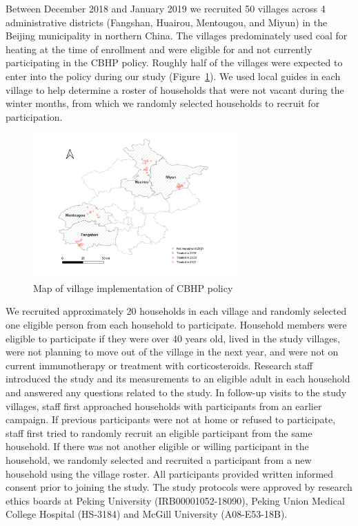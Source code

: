 \documentclass[
  letterpaper,
  DIV=11,
  numbers=noendperiod]{scrartcl}
\begin{document}
Between December 2018 and January 2019 we recruited 50 villages across 4
administrative districts (Fangshan, Huairou, Mentougou, and Miyun) in
the Beijing municipality in northern China. The villages predominately
used coal for heating at the time of enrollment and were eligible for
and not currently participating in the CBHP policy. Roughly half of the
villages were expected to enter into the policy during our study
(Figure~\ref{fig-cbhp-map}). We used local guides in each village to
help determine a roster of households that were not vacant during the
winter months, from which we randomly selected households to recruit for
participation.

\begin{figure}[H]

{\centering \includegraphics[width=0.7\textwidth,height=\textheight]{images/policy-implementation-map.png}

}

\caption{\label{fig-cbhp-map}Map of village implementation of CBHP
policy}

\end{figure}

We recruited approximately 20 households in each village and randomly
selected one eligible person from each household to participate.
Household members were eligible to participate if they were over 40
years old, lived in the study villages, were not planning to move out of
the village in the next year, and were not on current immunotherapy or
treatment with corticosteroids. Research staff introduced the study and
its measurements to an eligible adult in each household and answered any
questions related to the study. In follow-up visits to the study
villages, staff first approached households with participants from an
earlier campaign. If previous participants were not at home or refused
to participate, staff first tried to randomly recruit an eligible
participant from the same household. If there was not another eligible
or willing participant in the household, we randomly selected and
recruited a participant from a new household using the village roster.
All participants provided written informed consent prior to joining the
study. The study protocols were approved by research ethics boards at
Peking University (IRB00001052-18090), Peking Union Medical College
Hospital (HS-3184) and McGill University (A08-E53-18B).
\end{document}
